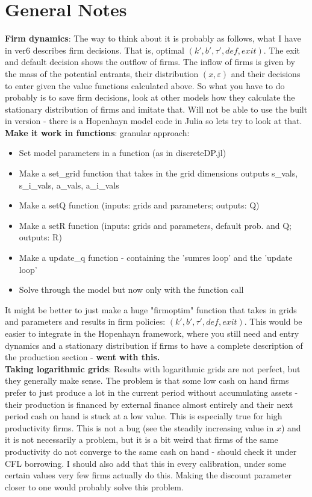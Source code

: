 \documentclass[12pt]{article}
\begin{document}
\newpage

\section*{General Notes}
\textbf{Firm dynamics}: The way to think about it is probably as follows, what I have in ver6 describes firm decisions. That is, optimal $(k',b', \tau', def, exit)$. The exit and default decision shows the outflow of firms. The inflow of firms is given by the mass of the potential entrants, their distribution $(x, \varepsilon)$ and their decisions to enter given the value functions calculated above. So what you have to do probably is to save firm decisions, look at other models how they calculate the stationary distribution of firms and imitate that. Will not be able to use the built in version - there is a Hopenhayn model code in Julia so lets try to look at that.  \vspace{3mm} \\
\noindent \textbf{Make it work in functions}: granular approach:
\begin{itemize}
    \item Set model parameters in a function (as in discreteDP.jl)
    \item Make a set\_grid function that takes in the grid dimensions outputs s\_vals, s\_i\_vals, a\_vals, a\_i\_vals
    \item Make a setQ function (inputs: grids and parameters; outputs: Q)
    \item Make a setR function (inputs: grids and parameters, default prob. and Q; outputs: R)
    \item Make a update\_q function - containing the 'sumres loop' and the 'update loop'
    \item Solve through the model but now only with the function call
\end{itemize}
It might be better to just make a huge "firmoptim" function that takes in grids and parameters and results in firm policies: $(k',b', \tau', def, exit)$. This would be easier to integrate in the Hopenhayn framework, where you still need and entry dynamics and a stationary distribution if firms to have a complete description of the production section - \textbf{went with this.} \vspace{3mm} \\
\textbf{Taking logarithmic grids}: Results with logarithmic grids are not perfect, but they generally make sense. The problem is that some low cash on hand firms prefer to just produce a lot in the current period without accumulating assets - their production is financed by external finance almost entirely and their next period cash on hand is stuck at a low value. This is especially true for high productivity firms. This is not a bug (see the steadily increasing value in $x$) and it is not necessarily a problem, but it is a bit weird that firms of the same productivity do not converge to the same cash on hand - should check it under CFL borrowing. I should also add that this in every calibration, under some certain values very few firms actually do this. Making the discount parameter closer to one would probably solve this problem.   \vspace{3mm} \\
\end{document}
